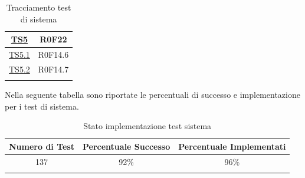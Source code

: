 \documentclass[../PianoDiQualifica.tex]{subfiles}
\begin{document}
\begin{longtable}{|c|c|}
	
		\hyperlink{TS5}{TS5} & R0F22   \\
		\hline
		\hyperlink{TS5.1}{TS5.1} & R0F14.6   \\
		\hline
		\hyperlink{TS5.2}{TS5.2} & R0F14.7   \\
		\hline
		\caption[Tracciamento test di sistema]{Tracciamento test di sistema}
		\label{tabella:TracciamentoTestSistema}
	\end{longtable}
	Nella seguente tabella sono riportate le percentuali di successo e implementazione per i test di sistema.
	\normalsize
	\begin{longtable}{|c|c|c|}
		\hline
		\textbf{Numero di Test} & \textbf{Percentuale Successo} & \textbf{Percentuale Implementati}\\
		\hline
		\endhead
		137 & %
		92\% & %
		96\%\\
		\hline
		\caption[Stato implementazione test sistema]{Stato implementazione test sistema}
		\label{tabella:Stato implementazione test sistema}
	\end{longtable}
	
\newpage
\end{document}
